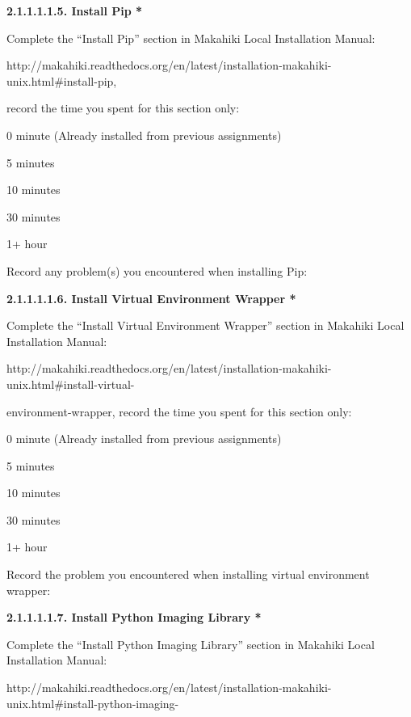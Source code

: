 {\bf 2.1.1.1.1.5. Install Pip *}

Complete the ``Install Pip'' section in Makahiki Local Installation Manual:

http://makahiki.readthedocs.org/en/latest/installation-makahiki-unix.html\#install-pip, 

record the time you spent for this section only:

\begin{radiobutton}
\item 0 minute (Already installed from previous assignments)
\item 5 minutes
\item  10 minutes
\item  30 minutes
\item  1+ hour
\end{radiobutton}

Record any problem(s) you encountered when installing Pip: \underline{\hspace{4cm}}

{\bf 2.1.1.1.1.6. Install Virtual Environment Wrapper *}

Complete the ``Install Virtual Environment Wrapper'' section in Makahiki Local Installation Manual:

http://makahiki.readthedocs.org/en/latest/installation-makahiki-unix.html\#install-virtual-

environment-wrapper, record the time you spent for this section only:

\begin{radiobutton}
\item 0 minute (Already installed from previous assignments)
\item 5 minutes
\item  10 minutes
\item  30 minutes
\item  1+ hour
\end{radiobutton}

Record the problem you encountered when installing virtual environment wrapper:

 \underline{\hspace{3cm}}

{\bf 2.1.1.1.1.7. Install Python Imaging Library *}

Complete the ``Install Python Imaging Library'' section in Makahiki Local Installation Manual:

http://makahiki.readthedocs.org/en/latest/installation-makahiki-unix.html\#install-python-imaging-

